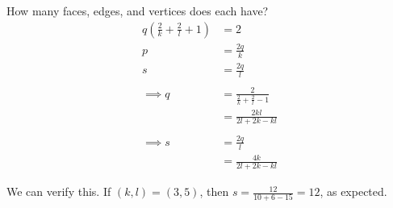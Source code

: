 \documentclass[]{article}
\theoremstyle{definition}
\begin{document}
				How many faces, edges, and vertices does each have?
				\begin{align*}
					q \left( \frac{2}{k} + \frac{2}{l} + 1 \right) &= 2 \\
					p &= \frac{2q}{k} \\
					s &= \frac{2q}{l} \\ \\
					\implies q &= \frac{2}{\frac{2}{k} + \frac{2}{l} - 1} \\
					&= \frac{2kl}{2l + 2k - kl}
					\\ \\
					\implies s &= \frac{2q}{l} \\
					&= \frac{4k}{2l + 2k - kl}
				\end{align*}

				We can verify this. If $(k, l) = (3, 5)$, then $s = \frac{12}{10 + 6 - 15} = 12$, as expected.

\end{document}
